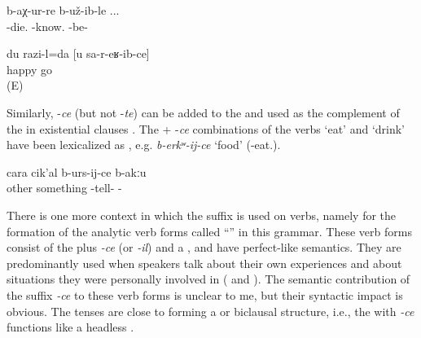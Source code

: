 \begin{exe}

	\ex	\label{ex:‎‎ She apparently got to know that he had died}
	\gll	[w-ebč'-ib-ce]	b-aχ-ur-re	b-už-ib-le ...\\
	-die.	-know.	-be- \\
	\glt	{}

	\ex	\label{ex:‎‎‎I am happy that you came_1}
	\gll	du	razi-l=da	[u		sa-r-eʁ-ib-ce]\\
			happy		go\\
	\glt	{} (E)
\end{exe}

Similarly, -\textit{ce} (but not -\textit{te}) can be added to the  and used as the complement of the  in existential clauses . The  + -\textit{ce} combinations of the verbs `eat' and `drink' have been lexicalized as , e.g. \textit{b-erkʷ-ij-ce} `food' (-eat.).

\begin{exe}
	\ex	\label{ex:‎‎There is nothing more to tell.min}
	\gll cara	cik'al	b-urs-ij-ce	b-akːu\\
	other	something	-tell-	- \\
	\glt	{}
\end{exe}

There is one more context in which the suffix is used on verbs, namely for the formation of the analytic verb forms called ``'' in this grammar. These verb forms consist of the  plus \textit{-ce} (or \textit{-il}) and a , and have perfect-like semantics. They are predominantly used when speakers talk about their own experiences and about situations they were personally involved in ( and ). The semantic contribution of the suffix \textit{-ce} to these verb forms is unclear to me, but their syntactic impact is obvious. The  tenses are close to forming a  or biclausal structure, i.e., the  with \textit{-ce} functions like a headless .

